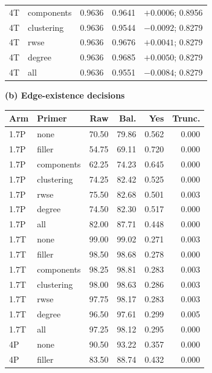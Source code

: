 \begin{table}[t]
\begin{minipage}[t]{.48\textwidth}
\begin{tabular}{llrrr}
4T & components & 0.9636 & 0.9641 & $+0.0006$; 0.8956\\ %
4T & clustering & 0.9636 & 0.9544 & $-0.0092$; 0.8279\\ %
4T & rwse & 0.9636 & 0.9676 & $+0.0041$; 0.8279\\ %
4T & degree & 0.9636 & 0.9685 & $+0.0050$; 0.8279\\ %
4T & all & 0.9636 & 0.9551 & $-0.0084$; 0.8279\\ %
\bottomrule
\end{tabular}
\end{minipage}\hfill
\begin{minipage}[t]{.48\textwidth}
\centering\footnotesize\setlength{\tabcolsep}{2.0pt}
\textbf{(b) Edge-existence decisions}\par\smallskip
\begin{tabular}{llrrrr}
\toprule
Arm & Primer & Raw & Bal. & Yes & Trunc.\\
\midrule
1.7P & none & 70.50 & 79.86 & 0.562 & 0.000\\ %
1.7P & filler & 54.75 & 69.11 & 0.720 & 0.000\\ %
1.7P & components & 62.25 & 74.23 & 0.645 & 0.000\\ %
1.7P & clustering & 74.25 & 82.42 & 0.525 & 0.000\\ %
1.7P & rwse & 75.50 & 82.68 & 0.501 & 0.003\\ %
1.7P & degree & 74.50 & 82.30 & 0.517 & 0.000\\ %
1.7P & all & 82.00 & 87.71 & 0.448 & 0.000\\ %
\addlinespace[2pt]
1.7T & none & 99.00 & 99.02 & 0.271 & 0.003\\ %
1.7T & filler & 98.50 & 98.68 & 0.278 & 0.000\\ %
1.7T & components & 98.25 & 98.81 & 0.283 & 0.003\\ %
1.7T & clustering & 98.00 & 98.63 & 0.286 & 0.003\\ %
1.7T & rwse & 97.75 & 98.17 & 0.283 & 0.003\\ %
1.7T & degree & 96.50 & 97.61 & 0.299 & 0.005\\ %
1.7T & all & 97.25 & 98.12 & 0.295 & 0.000\\ %
\addlinespace[2pt]
4P & none & 90.50 & 93.22 & 0.357 & 0.000\\ %
4P & filler & 83.50 & 88.74 & 0.432 & 0.000\\ %

\end{tabular}
\end{minipage}
\end{table}
